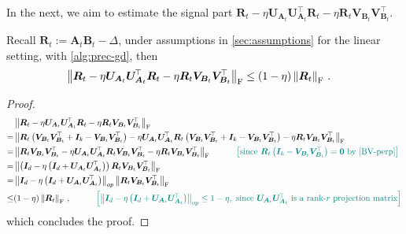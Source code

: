 In the next, we aim to estimate the signal part $\bm R_t - \eta \bm U_{\bm A_t} \bm U_{\bm A_t}^{\!\top}\bm R_t - \eta \bm R_t\bm V_{\bm B_t} \bm V_{\bm B_t}^{\!\top}$.
\begin{lemma}
\label{strict-equal-F-norm}
    Recall $\bm R_t := \bm A_{t}\bm B_{t} - \Delta$, under assumptions in \cref{sec:assumptions} for the linear setting, with \eqref{alg:prec-gd}, then
    \begin{align*}
        \left\|\bm R_t - \eta \bm U_{\bm A_t} \bm U_{\bm A_t}^{\!\top}\bm R_t - \eta \bm R_t\bm V_{\bm B_t} \bm V_{\bm B_t}^{\!\top}\right\|_{\rm F} & \leq (1-\eta) \left\|\bm R_t\right\|_{\rm F}\,.
    \end{align*}
\end{lemma}
\begin{proof}
    \begin{align*}
        &\left\|\bm R_t - \eta \bm U_{\bm A_t} \bm U_{\bm A_t}^{\!\top}\bm R_t - \eta \bm R_t\bm V_{\bm B_t} \bm V_{\bm B_t}^{\!\top}\right\|_{\rm F}\\
        = & \left\|\bm R_t \left(\bm V_{\bm B_t} \bm V_{\bm B_t}^{\!\top}+\bm I_k - \bm V_{\bm B_t} \bm V_{\bm B_t}^{\!\top}\right) - \eta \bm U_{\bm A_t} \bm U_{\bm A_t}^{\!\top}\bm R_t \left(\bm V_{\bm B_t} \bm V_{\bm B_t}^{\!\top}+\bm I_k - \bm V_{\bm B_t} \bm V_{\bm B_t}^{\!\top}\right) - \eta \bm R_t\bm V_{\bm B_t} \bm V_{\bm B_t}^{\!\top}\right\|_{\rm F}\\
        = & \left\|\bm R_t \bm V_{\bm B_t} \bm V_{\bm B_t}^{\!\top} - \eta \bm U_{\bm A_t} \bm U_{\bm A_t}^{\!\top}\bm R_t \bm V_{\bm B_t} \bm V_{\bm B_t}^{\!\top} - \eta \bm R_t\bm V_{\bm B_t} \bm V_{\bm B_t}^{\!\top}\right\|_{\rm F} \quad \tag*{\color{teal}$\left[\text{since }\bm R_t\left(\bm I_k - \bm V_{\bm B_t} \bm V_{\bm B_t}^{\!\top}\right)=\bm 0\text{ by \cref{BV-perp}}\right]$}\\
        = & \left\|\left(\bm I_d - \eta \left(\bm I_d + \bm U_{\bm A_t} \bm U_{\bm A_t}^{\!\top}\right)\right)\bm R_t \bm V_{\bm B_t} \bm V_{\bm B_t}^{\!\top}\right\|_{\rm F}\\
        = & \left\|\bm I_d - \eta \left(\bm I_d + \bm U_{\bm A_t} \bm U_{\bm A_t}^{\!\top}\right)\right\|_{op}\left\|\bm R_t \bm V_{\bm B_t} \bm V_{\bm B_t}^{\!\top}\right\|_{\rm F}\\
        \leq & (1-\eta) \left\|\bm R_t\right\|_{\rm F}\,,\quad \tag*{\color{teal}$\left[\left\|\bm I_d - \eta \left(\bm I_d + \bm U_{\bm A_t} \bm U_{\bm A_t}^{\!\top}\right)\right\|_{op}\leq 1-\eta, \text{ since }\bm U_{\bm A_t} \bm U_{\bm A_t}^{\!\top}\text{ is a rank-}r\text{ projection matrix}\right]$}
    \end{align*}
    which concludes the proof.
\end{proof}

